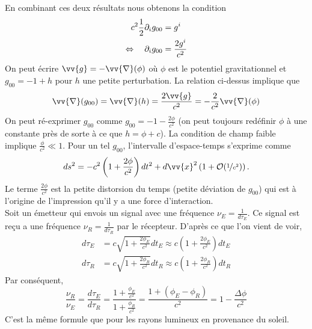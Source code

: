 \documentclass[a4paper,11pt]{report}
\begin{document}
            En combinant ces deux résultats nous obtenons la condition
            \begin{align}
                c^2\frac{1}{2}\partial_i g_{00} &= g^i \\
                \Leftrightarrow\quad \partial_i g_{00} &= \frac{2g^i}{c^2} 
            \end{align}
            On peut écrire $\vv{g}=-\vv{\nabla}(\phi)$ où $\phi$ est le potentiel gravitationnel et $g_{00}=-1+h$ pour $h$ une petite perturbation. La relation ci-dessus implique que
            \begin{equation}
                \vv{\nabla}(g_{00}) = \vv{\nabla}(h) = \frac{2\vv{g}}{c^2} = -\frac{2}{c^2}\vv{\nabla}(\phi)
            \end{equation}
            On peut ré-exprimer $g_{00}$ comme $g_{00} = -1-\frac{2\phi}{c^2}$ (on peut toujours redéfinir $\phi$ à une constante près de sorte à ce que $h = \phi+c$). La condition de champ faible implique $\frac{\phi}{c^2}\ll 1$. Pour un tel $g_{00}$, l'intervalle d'espace-temps s'exprime comme
            \begin{equation}
                ds^2 = -c^2\left( 1+\frac{2\phi}{c^2} \right)dt^2 + d\vv{x}^2\left( 1+\order{\nicefrac{1}{c^2}} \right).
            \end{equation}
            Le terme $\frac{2\phi}{c^2}$ est la petite distorsion du temps (petite déviation de $g_{00}$) qui est à l'origine de l'impression qu'il y a une force d'interaction.\\
            
            Soit un émetteur qui envois un signal avec une fréquence $\nu_E = \frac{1}{d\tau_E}$. Ce signal est reçu a une fréquence $\nu_R = \frac{1}{d\tau_R}$ par le récepteur. D'après ce que l'on vient de voir,
            \begin{align}
                d\tau_E &= c\sqrt{1+\frac{2\phi_E}{c^2}}dt_E \approx c\left( 1+\frac{2\phi_E}{c^2} \right) dt_E\\
                d\tau_R &= c\sqrt{1+\frac{2\phi_R}{c^2}}dt_R \approx c\left( 1+\frac{2\phi_R}{c^2} \right) dt_R
            \end{align}
            Par conséquent,
            \begin{equation}
                \frac{\nu_R}{\nu_E} = \frac{d\tau_E}{d\tau_R} = \frac{1+\frac{\phi_E}{c^2}}{1+\frac{\phi_R}{c^2}} = \frac{1+ (\phi_E-\phi_R)}{c^2} = 1-\frac{\Delta \phi}{c^2}
            \end{equation}
            C'est la même formule que pour les rayons lumineux en provenance du soleil.
\end{document}
